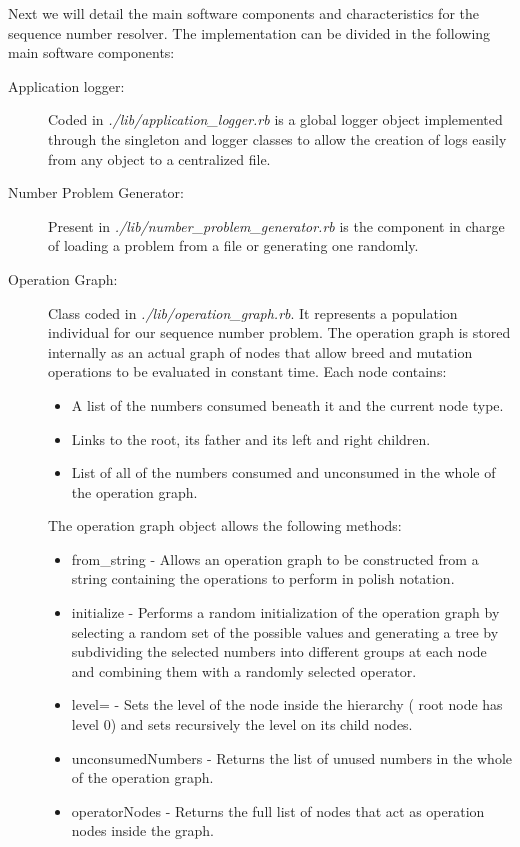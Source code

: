 \documentclass[a4paper,10pt,titlepage]{article}
\begin{document}
\par Next we will detail the main software components and characteristics for the sequence number resolver. The implementation can be divided in the following main software components:
\begin{description}
	\item[Application logger:] Coded in \textit{./lib/application\_logger.rb} is a global logger object implemented through the singleton and logger classes to allow the creation of logs easily from any object to a centralized file.
	\item[Number Problem Generator:] Present in \textit{./lib/number\_problem\_generator.rb} is the component in charge of loading a problem from a file or generating one randomly.
	\item[Operation Graph:] Class coded in \textit{./lib/operation\_graph.rb}. It represents a population individual for our sequence number problem. The operation graph is stored internally as an actual graph of nodes that allow breed and mutation operations to be evaluated in constant time. Each node contains:
	\begin{itemize}
		\item A list of the numbers consumed beneath it and the current node type.
		\item Links to the root, its father and its left and right children.
		\item List of all of the numbers consumed and unconsumed in the whole of the operation graph.
	\end{itemize}
	The operation graph object allows the following methods:
	\begin{itemize}
		\item from\_string - Allows an operation graph to be constructed from a string containing the operations to perform in polish notation. 
		\item initialize - Performs a random initialization of the operation graph by selecting a random set of the possible values and generating a tree by subdividing the selected numbers into different groups at each node and combining them with a randomly selected operator.  
		\item level= - Sets the level of the node inside the hierarchy ( root node has level 0) and sets recursively the level on its child nodes.
		\item unconsumedNumbers - Returns the list of unused numbers in the whole of the operation graph.
		\item operatorNodes - Returns the full list of nodes that act as operation nodes inside the graph.

\end{itemize}
\end{description}
\end{document}

